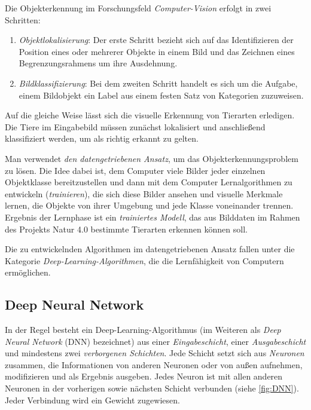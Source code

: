 Die Objekterkennung im Forschungsfeld \emph{Computer-Vision} erfolgt in zwei Schritten:

\begin{enumerate}
	\item \emph{Objektlokalisierung}: Der erste Schritt bezieht sich auf das Identifizieren der Position eines oder mehrerer Objekte in einem Bild und das Zeichnen eines Begrenzungsrahmens um ihre Ausdehnung.
	
	\item \emph{Bildklassifizierung}: Bei dem zweiten Schritt handelt es sich um die Aufgabe, einem Bildobjekt ein Label aus einem festen Satz von Kategorien zuzuweisen.
\end{enumerate}

Auf die gleiche Weise lässt sich die visuelle Erkennung von Tierarten erledigen. Die Tiere im Eingabebild müssen zunächst lokalisiert und anschließend klassifiziert werden, um als richtig erkannt zu gelten.

Man verwendet \emph{den datengetriebenen Ansatz}, um das Objekterkennungsproblem zu lösen. Die Idee dabei ist, dem Computer viele Bilder jeder einzelnen Objektklasse bereitzustellen und dann mit dem Computer Lernalgorithmen zu entwickeln (\emph{trainieren}), die sich diese Bilder ansehen und visuelle Merkmale lernen, die Objekte von ihrer Umgebung und jede Klasse voneinander trennen. Ergebnis der Lernphase ist ein \emph{trainiertes Modell}, das aus Bilddaten im Rahmen des Projekts Natur 4.0 bestimmte Tierarten erkennen können soll.

Die zu entwickelnden Algorithmen im datengetriebenen Ansatz fallen unter die Kategorie \emph{Deep-Learning-Algorithmen}, die die Lernfähigkeit von Computern ermöglichen.

\subsection{Deep Neural Network}

In der Regel besteht ein Deep-Learning-Algorithmus (im Weiteren als \emph{Deep Neural Network} (DNN) bezeichnet) aus einer \emph{Eingabeschicht}, einer \emph{Ausgabeschicht} und mindestens zwei \emph{verborgenen Schichten}. Jede Schicht setzt sich aus \emph{Neuronen} zusammen, die Informationen von anderen Neuronen oder von außen aufnehmen, modifizieren und als Ergebnis ausgeben. Jedes Neuron ist mit allen anderen Neuronen in der vorherigen sowie nächsten Schicht verbunden (siehe \autoref{fig:DNN}). Jeder Verbindung wird ein Gewicht zugewiesen.

